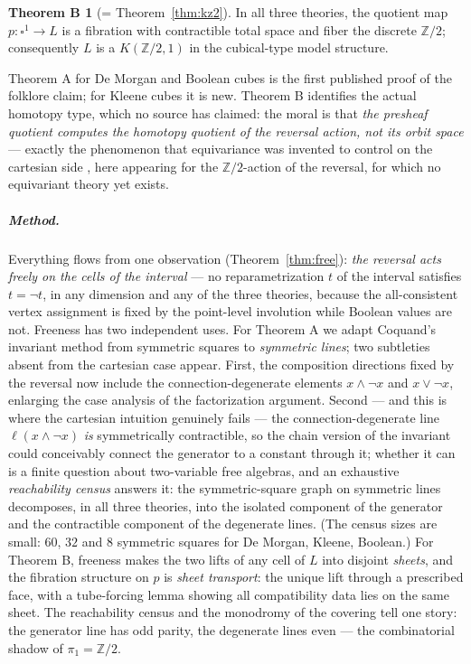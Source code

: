 \documentclass[11pt]{amsart}
\theoremstyle{definition}
\newtheorem*{thmB}{Theorem B}
\newcommand{\Ldash}{L}
\begin{document}
\begin{thmB}[= Theorem~\ref{thm:kz2}]
  In all three theories, the quotient map
  $p : \square^1 \to \Ldash$ is a fibration with contractible total
  space and fiber the discrete $\mathbb{Z}/2$; consequently
  $\Ldash$ is a $K(\mathbb{Z}/2, 1)$ in the cubical-type model
  structure.
\end{thmB}

Theorem A for De Morgan and Boolean cubes is the first published
proof of the folklore claim; for Kleene cubes it is new.  Theorem B
identifies the actual homotopy type, which no source has claimed:
the moral is that \emph{the presheaf quotient computes the homotopy
quotient of the reversal action, not its orbit space} --- exactly
the phenomenon that equivariance was invented to control on the
cartesian side \cite{ACCRS}, here appearing for the
$\mathbb{Z}/2$-action of the reversal, for which no equivariant
theory yet exists.

\subparagraph*{Method.}  Everything flows from one observation
(Theorem~\ref{thm:free}): \emph{the reversal acts freely on the
cells of the interval} --- no reparametrization $t$ of the interval
satisfies $t = \neg t$, in any dimension and any of the three
theories, because the all-consistent vertex assignment
is fixed by the point-level involution while Boolean values are
not.  Freeness has two independent uses.  For Theorem A we adapt
Coquand's invariant method \cite[\S4--5]{CoqNote} from symmetric
squares to \emph{symmetric lines}; two subtleties absent from the
cartesian case appear.  First, the composition directions fixed by
the reversal now include the connection-degenerate elements
$x \wedge \neg x$ and $x \vee \neg x$, enlarging the case analysis
of the factorization argument.  Second --- and this is where the
cartesian intuition genuinely fails --- the connection-degenerate
line $\ell(x \wedge \neg x)$ \emph{is} symmetrically contractible,
so the chain version of the invariant could conceivably connect
the generator to a constant through it; whether it can is a finite
question about two-variable free algebras, and an exhaustive
\emph{reachability census} answers it: the symmetric-square graph
on symmetric lines decomposes, in all three theories, into the
isolated component of the generator and the contractible component
of the degenerate lines.  (The census sizes are small: $60$, $32$
and $8$ symmetric squares for De Morgan, Kleene, Boolean.)  For
Theorem B, freeness makes the two lifts of any cell of $\Ldash$
into disjoint \emph{sheets}, and the fibration structure on $p$ is
\emph{sheet transport}: the unique lift through a prescribed face,
with a tube-forcing lemma showing all compatibility data lies on
the same sheet.  The reachability census and the monodromy of the
covering tell one story: the generator line has odd parity, the
degenerate lines even --- the combinatorial shadow of
$\pi_1 = \mathbb{Z}/2$.
\end{document}
